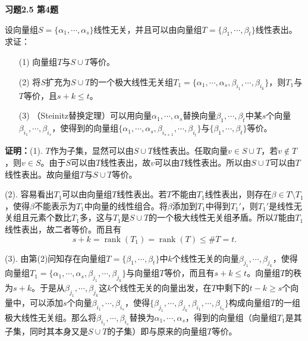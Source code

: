 
\renewcommand{\newpageorvspace}{\vspace{2em}}

\date{2021-10-15  第二次习题课}



\maketitle

{\bf 习题2.5 第4题}

设向量组$S = \{ \alpha_1, \cdots, \alpha_s \}$线性无关，并且可以由向量组$T = \{ \beta_1, \cdots, \beta_t \}$线性表出。求证：
\begin{itemize}
\item[(1)] 向量组$T$与$S\cup T$等价。
\item[(2)] 将$S$扩充为$S\cup T$的一个极大线性无关组$T_1 = \{ \alpha_1, \cdots, \alpha_s, \beta_{i_1}, \cdots, \beta_{i_k} \}$，则$T_1$与$T$等价，且$s+k\leqslant t$。
\item[(3)] （Steinitz替换定理）可以用向量$\alpha_1, \cdots, \alpha_s$替换向量$\beta_1, \cdots, \beta_t$中某$s$个向量$\beta_{i_1}, \cdots, \beta_{i_s}$，使得到的向量组$\{ \alpha_1, \cdots, \alpha_s, \beta_{i_{s+1}}, \cdots, \beta_{i_t} \}$与$\{ \beta_1, \cdots, \beta_t \}$等价。
\end{itemize}

{\bf 证明：}(1). $T$作为子集，显然可以由$S\cup T$线性表出。任取向量$v\in S\cup T$，若$v\not\in T$，则$v\in S$。由于$S$可以由$T$线性表出，故$v$可以由$T$线性表出。所以由$S\cup T$可以由$T$线性表出。故向量组$T$与$S\cup T$等价。

(2). 容易看出$T_1$可以由向量组$T$线性表出。若$T$不能由$T_1$线性表出，则存在$\beta \in T\setminus T_1$，使得$\beta$不能表示为$T_1$中向量的线性组合。将$\beta$添加到$T_1$中得到$T_1'$，则$T_1'$是线性无关组且元素个数比$T_1$多，这与$T_1$是$S\cup T$的一个极大线性无关组矛盾。所以$T$能由$T_1$线性表出，故二者等价。而且有
$$s+k = \operatorname{rank}(T_1) = \operatorname{rank}(T) \leqslant \# T = t.$$

(3). 由第(2)问知存在向量组$T = \{ \beta_1, \cdots, \beta_t \}$中$k$个线性无关的向量$\beta_{j_1}, \cdots, \beta_{j_k}$，使得向量组$T_1 = \{ \alpha_1, \cdots, \alpha_s, \beta_{j_1}, \cdots, \beta_{j_k} \}$与向量组$T$等价，而且有$s+k\leqslant t$。向量组$T$的秩为$s+k$。于是从$\beta_{j_1}, \cdots, \beta_{j_k}$这$k$个线性无关的向量出发，在$T$中剩下的$t-k\geqslant s$个向量中，可以添加$s$个向量$\beta_{i_1}, \cdots, \beta_{i_s}$，使得$\{ \beta_{j_1}, \cdots, \beta_{j_k}, \beta_{i_1}, \cdots, \beta_{i_s} \}$构成向量组$T$的一组极大线性无关组。那么将$\beta_{i_1}, \cdots, \beta_{i_s}$替换为$\alpha_1, \cdots, \alpha_s$，得到的向量组（向量组$T_1$是其子集，同时其本身又是$S\cup T$的子集）即与原来的向量组$T$等价。

